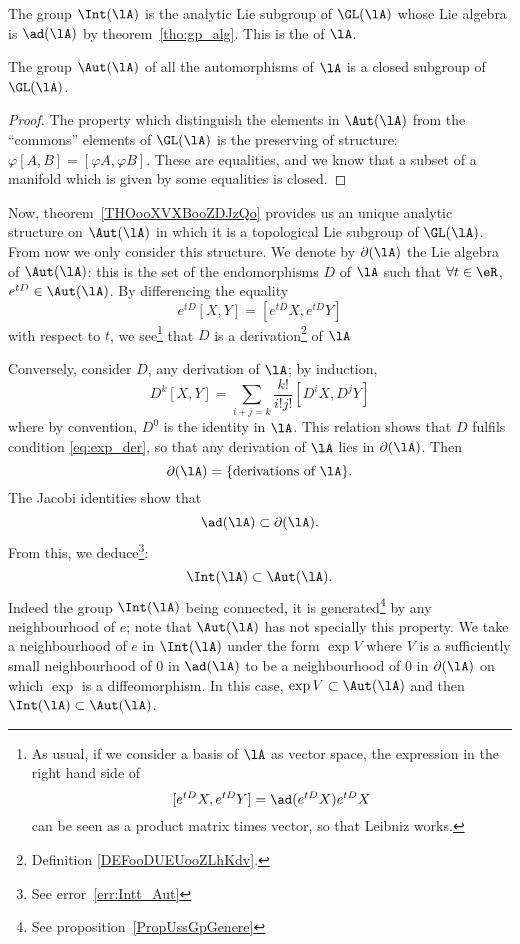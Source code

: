 The group $\Int(\lA)$ is the analytic Lie subgroup of $\GL(\lA)$ whose Lie algebra is $\ad(\lA)$ by theorem~\ref{tho:gp_alg}. This is the  of $\lA$.

\begin{proposition}
	The group $\Aut(\lA)$ of all the automorphisms of $\lA$ is a closed subgroup of $\GL(\lA)$.
\end{proposition}

\begin{proof}
	The property which distinguish the elements in $\Aut(\lA)$ from the ``commons'' elements of $\GL(\lA)$ is the preserving of structure: $\varphi[A,B]=[\varphi A,\varphi B]$. These are equalities, and we know that a subset of a manifold which is given by some equalities is closed.
\end{proof}

Now, theorem~\ref{THOooXVXBooZDJzQo} provides us an unique analytic structure on $\Aut(\lA)$ in which it is a topological Lie subgroup of $\GL(\lA)$. From now we only consider this structure. We denote by $\partial(\lA)$ the Lie algebra of $\Aut(\lA)$: this is the set of the endomorphisms $D$ of $\lA$ such that $\forall t\in\eR$, $e^{tD}\in\Aut(\lA)$. By differencing the equality
\begin{equation}\label{eq:exp_der}
	e^{tD}[X,Y]=[e^{tD}X,e^{tD}Y]
\end{equation}
with respect to $t$, we see\footnote{As usual, if we consider a basis of $\lA$ as vector space, the expression in the right hand side of \[[e^{tD}X,e^{tD}Y]=\ad(e^{tD}X)e^{tD}X\] can be seen as a product matrix times vector, so that Leibniz works.} that $D$ is a derivation\footnote{Definition \ref{DEFooDUEUooZLhKdv}.} of \( \lA\)

Conversely, consider $D$, any derivation of $\lA$; by induction,
\begin{equation}
	D^k[X,Y]=\sum_{i+j=k}\frac{k!}{i!j!}[D^iX,D^jY]
\end{equation}
where by convention, $D^0$ is the identity in $\lA$. This relation shows that $D$ fulfils condition \eqref{eq:exp_der}, so that any derivation of $\lA$ lies in $\partial(\lA)$. Then
\[
	\partial(\lA)=\{\text{derivations of }\lA\}.
\]
The Jacobi identities show that
\[
	\ad(\lA)\subset\partial(\lA).    \label{pg:ad_subset_der}
\]
From this, we deduce\footnote{See error~\ref{err:Intt_Aut}}:
\begin{equation}\label{eq:int_sub_aut}
	\Int(\lA)\subset\Aut(\lA).
\end{equation}
Indeed the group $\Int(\lA)$ being connected, it is generated\footnote{See proposition~\ref{PropUssGpGenere}} by any neighbourhood of $e$; note that $\Aut(\lA)$ has not specially this property. We take a neighbourhood of $e$ in $\Int(\lA)$ under the form  $\exp V$  where $V$ is a sufficiently small neighbourhood of $0$ in $\ad(\lA)$ to be a neighbourhood of $0$ in $\partial(\lA)$ on which $\exp$ is a diffeomorphism. In this case, $\exp V\subset\Aut(\lA)$ and then $\Int(\lA)\subset\Aut(\lA)$.

